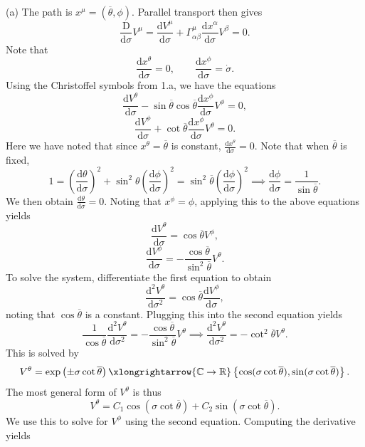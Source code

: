 \documentclass[11pt, letterpaper]{article}
\theoremstyle{plain}
\begin{document}
(a) The path is $x^\mu =(\overline{\theta } ,\phi )$. Parallel transport then gives
\[
	\frac{\mathrm{D}}{\mathrm{d}\sigma } V^\mu =\frac{\mathrm{d}V^\mu }{\mathrm{d}\sigma } +\Gamma ^\mu _{\alpha \beta } \frac{\mathrm{d}x^\alpha }{\mathrm{d}\sigma } V^\beta =0
.\]
Note that
\[
	\frac{\mathrm{d}x^\theta }{\mathrm{d}\sigma } =0,\qquad \frac{\mathrm{d}x^\phi }{\mathrm{d}\sigma } =\dot{\sigma } 
.\]
Using the Christoffel symbols from 1.a, we have the equations
\[
	\frac{\mathrm{d}V^\theta }{\mathrm{d}\sigma } - \sin \overline{\theta } \cos \overline{\theta } \frac{\mathrm{d}x^\phi }{\mathrm{d}\sigma } V^\phi =0,
\]
\[
	\frac{\mathrm{d}V^\phi }{\mathrm{d}\sigma } +\cot \overline{\theta } \frac{\mathrm{d}x^\phi }{\mathrm{d}\sigma }  V^\theta =0 
.\]
Here we have noted that since $x^\theta =\overline{\theta } $ is constant, $\frac{\mathrm{d}x^\theta }{\mathrm{d}\sigma } =0$. Note that when $\overline{\theta } $ is fixed,
\[
	1=\left( \frac{\mathrm{d}\theta }{\mathrm{d}\sigma }  \right) ^2+\sin ^2\theta \left( \frac{\mathrm{d}\phi }{\mathrm{d}\sigma }  \right) ^2 = \sin ^2 \overline{\theta } \left( \frac{\mathrm{d}\phi }{\mathrm{d}\sigma }  \right) ^2 \implies \frac{\mathrm{d}\phi }{\mathrm{d}\sigma } =\frac{1}{\sin \overline{\theta } } 
.\]
We then obtain $\frac{\mathrm{d}\theta }{\mathrm{d}\sigma } =0$. Noting that $x^\phi =\phi $, applying this to the above equations yields
\[
	\frac{\mathrm{d}V^\theta }{\mathrm{d}\sigma } =\cos \overline{\theta } V^\phi ,
\]
\[
	\frac{\mathrm{d}V^\phi }{\mathrm{d}\sigma } = -\frac{\cos \overline{\theta } }{\sin ^2 \overline{\theta } } V^\theta 
.\]
To solve the system, differentiate the first equation to obtain
\[
	\frac{\mathrm{d}^2 V^\theta }{\mathrm{d}\sigma ^2} =\cos \overline{\theta } \frac{\mathrm{d}V^\phi }{\mathrm{d}\sigma } ,
\]
noting that $\cos \overline{\theta } $ is a constant. Plugging this into the second equation yields
\[
	\frac{1}{\cos \overline{\theta } } \frac{\mathrm{d}^2V^\theta }{\mathrm{d}\sigma ^2} = -\frac{\cos \overline{\theta } }{\sin ^2 \overline{\theta } } V^\theta  \implies \frac{\mathrm{d}^2 V^\theta }{\mathrm{d}\sigma ^2} =- \cot^2 \overline{\theta } V^\theta 
.\]
This is solved by
\[
	V^\theta = \exp \left( \pm \sigma \cot \overline{\theta }  \right) \xlongrightarrow{\mathbb{C} \to \mathbb{R} } \left\{ \cos (\sigma \cot \overline{\theta } ),\sin (\sigma \cot \overline{\theta } ) \right\} 
.\]
The most general form of $V^\theta $ is thus
\[
	V^\theta =C_1 \cos (\sigma \cot \overline{\theta } )+C_2 \sin (\sigma \cot \overline{\theta } )
.\]
We use this to solve for $V^\phi $ using the second equation. Computing the derivative yields
\end{document}
